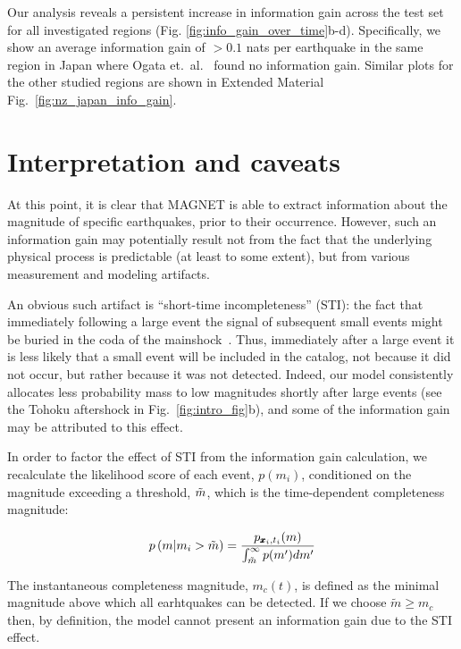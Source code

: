 \documentclass[pdflatex]{sn-jnl}
\begin{document}
Our analysis reveals a persistent increase in information gain across the test set for all investigated regions (Fig. \ref{fig:info_gain_over_time}b-d). Specifically, we show an average information gain of $>0.1$ nats per earthquake in the same region in Japan where Ogata et.~al.~\cite{ogata_exploring_2018} found no information gain. Similar plots for the other studied regions are shown in Extended Material Fig.~\ref{fig:nz_japan_info_gain}.

\section{Interpretation and caveats}
At this point, it is clear that MAGNET is able to extract information about the magnitude of specific earthquakes, prior to their occurrence. However, such an information gain may potentially result not from the fact that the underlying physical process is predictable (at least to some extent), but from various measurement and modeling artifacts. 

An obvious such artifact is ``short-time incompleteness'' (STI): the fact that immediately following a large event the signal of subsequent small events might be buried in the coda of the mainshock~\cite{kagan_short-term_2004, stockman_forecasting_2023}. Thus, immediately after a large event it is less likely that a small event will be included in the catalog, not because it did not occur, but rather because it was not detected. Indeed, our model consistently allocates less probability mass to low magnitudes shortly after large events (see the Tohoku aftershock in Fig.~\ref{fig:intro_fig}b), and some of the information gain may be attributed to this effect.  

In order to factor the effect of STI from the information gain calculation, we recalculate the likelihood score of each event, $p(m_i)$, conditioned on the magnitude exceeding a threshold, $\Tilde{m}$, which is the time-dependent completeness magnitude:

\begin{equation}
    p \left( m \vert m_i > \Tilde{m} \right) = \frac{p_{\pmb{x}_i, t_i}(m)} {\int_{\Tilde{m}}^{\infty} p(m') dm'}
    \label{eq:conditioned_likelihood}
\end{equation}

The instantaneous completeness magnitude, $m_c(t)$, is defined as the minimal magnitude above which all earhtquakes can be detected. If we choose $\tilde m \geq m_c$ then, by definition, the model cannot present an information gain due to the STI effect.
\end{document}
